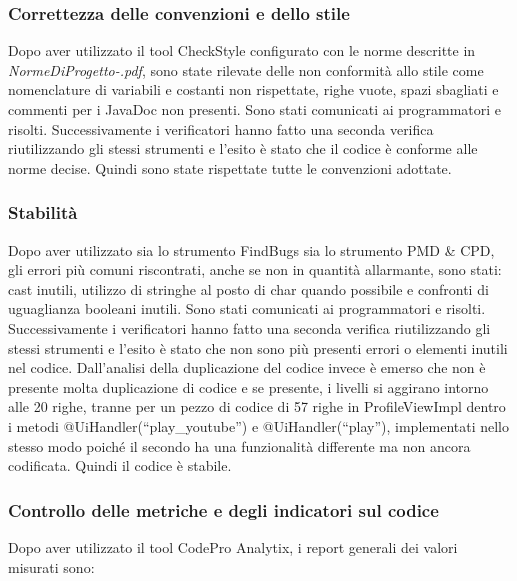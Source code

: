 \subsubsection*{Correttezza delle convenzioni e dello stile}
Dopo aver utilizzato il tool CheckStyle configurato con le norme descritte in
\emph{NormeDiProgetto-\versionenormeprogetto.pdf}, sono state rilevate delle non
conformit\`a allo stile come nomenclature di variabili e costanti non
rispettate, righe vuote, spazi sbagliati e commenti per i JavaDoc non presenti.
Sono stati comunicati ai programmatori e risolti. Successivamente i verificatori
hanno fatto una seconda verifica riutilizzando gli stessi strumenti e l'esito
\`e stato che il codice \`e conforme alle norme decise. Quindi sono state
rispettate tutte le convenzioni adottate.

\subsubsection*{Stabilit\`a}
Dopo aver utilizzato sia lo strumento FindBugs sia lo strumento PMD \& CPD, gli
errori pi\`u comuni riscontrati, anche se non in quantit\`a allarmante, sono
stati: cast inutili, utilizzo di stringhe al posto di char quando possibile
e confronti di uguaglianza booleani inutili. Sono stati
comunicati ai programmatori e risolti. Successivamente i verificatori hanno
fatto una seconda verifica riutilizzando gli stessi strumenti e l'esito \`e
stato che non sono pi\`u presenti errori o elementi inutili nel codice. 
Dall'analisi della duplicazione del
codice invece \`e emerso che non \`e presente molta duplicazione di codice e se
presente, i livelli si aggirano intorno alle 20 righe, tranne per un pezzo di
codice di 57 righe in ProfileViewImpl dentro i metodi @UiHandler(``play\_youtube'') e
@UiHandler(``play''), implementati nello stesso modo poich\'e il
secondo ha una funzionalit\`a differente ma non ancora codificata. Quindi
il codice \`e stabile.

\subsubsection*{Controllo delle metriche e degli indicatori sul codice}
Dopo aver utilizzato il tool CodePro Analytix, i report generali dei valori
misurati sono:

